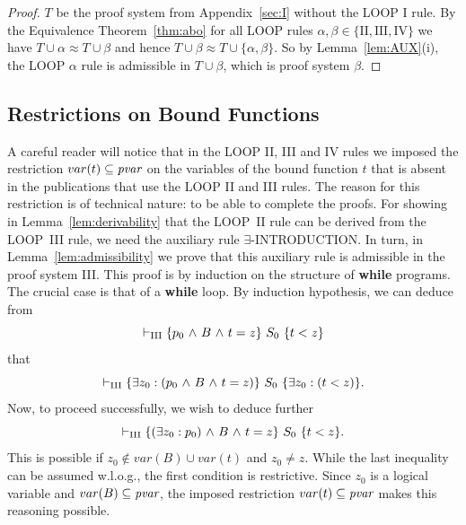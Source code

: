 \documentclass[manuscript, screen, review]{acmart}
\begin{document}
\begin{proof}
  $T$ be the proof system from Appendix~\ref{sec:I} without the LOOP I
  rule.  By the Equivalence Theorem~\ref{thm:abo} for all LOOP rules
  $\alpha, \beta \in \{\mathrm{II, III, IV}\}$ we have
  $T \cup \alpha \approx T \cup \beta$ and hence
  $T \cup \beta \approx T \cup \{\alpha, \beta\}$.  So by
  Lemma~\ref{lem:AUX}(i), the LOOP $\alpha$ rule is 
  admissible in $T \cup \beta$, which is proof system $\beta$.
\end{proof}



\subsection{Restrictions on Bound Functions}

A careful reader will notice that in the LOOP II, III and IV rules we
imposed the restriction $var(t) \subseteq \mbox{\it pvar}$ on the
variables of the bound function $t$ that is absent in the publications
that use the LOOP II and III rules.
The reason for this restriction is of technical nature: to be able 
to complete the proofs.
For showing in Lemma~\ref{lem:derivability} that the LOOP~II rule can
be derived from the LOOP~III rule, we need the auxiliary rule
$\exists$-INTRODUCTION. In turn, in Lemma~\ref{lem:admissibility}
we prove that this auxiliary rule is admissible in the proof system III.
This proof is by induction on the structure of {\bf while} programs.
The crucial case is that of a {\bf while} loop. By induction hypothesis,
we can deduce from 
\[
 \vdash_{\rm{III}} \mbox{$\{{p_{0} \mbox{$\ \wedge\ $} B \mbox{$\ \wedge\ $} t = z}\}\ {S_0}\ \{{t < z}\}$}
\]
that
\[
 \vdash_{\rm{III}} \mbox{$\{{\mbox{$\exists$} z_0: (p_{0} \mbox{$\ \wedge\ $} B \mbox{$\ \wedge\ $} t = z)}\}\ {S_0}\ \{{\mbox{$\exists$} z_0: (t < z)}\}$}.
\]
Now, to proceed successfully, we wish to deduce further 
\[
 \vdash_{\rm{III}} \mbox{$\{{(\mbox{$\exists$} z_0:p_0) \mbox{$\ \wedge\ $} B \mbox{$\ \wedge\ $} t = z}\}\ {S_0}\ \{{t < z}\}$}.
\]
This is possible if $z_0 \not\in var(B) \cup var(t)$ and $z_0 \neq z$.
While the last inequality can be assumed w.l.o.g., the first condition
is restrictive.
Since $z_0$ is a logical variable and $var(B) \subseteq \mbox{\it pvar}$,
the imposed restriction $var(t) \subseteq \mbox{\it pvar}$ makes this reasoning
possible.
\end{document}
